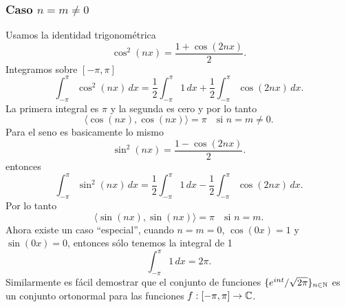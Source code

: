 \documentclass[main.tex]{subfiles}
\begin{document}
\subsubsection{Caso \(n = m \neq 0\)}
Usamos la identidad trigonométrica
\[
\cos^2(nx) = \frac{1 + \cos(2nx)}{2}.
\]
Integramos sobre \([-\pi, \pi]\)
\[
\int_{-\pi}^{\pi} \cos^2(nx) \, dx = \frac{1}{2} \int_{-\pi}^{\pi} 1 \, dx + \frac{1}{2} \int_{-\pi}^{\pi} \cos(2nx) \, dx.
\]
La primera integral es \(\pi\) y la segunda es cero y por lo tanto
\[
\langle \cos(nx), \cos(nx) \rangle = \pi \quad \text{si } n = m \neq 0.
\]
Para el seno es basicamente lo mismo
\[
\sin^2(nx) = \frac{1 - \cos(2nx)}{2}.
\]
entonces
\[
\int_{-\pi}^{\pi} \sin^2(nx) \, dx = \frac{1}{2} \int_{-\pi}^{\pi} 1 \, dx - \frac{1}{2} \int_{-\pi}^{\pi} \cos(2nx) \, dx.
\]
Por lo tanto
\[
\langle \sin(nx), \sin(nx) \rangle = \pi \quad \text{si } n = m.
\]
Ahora existe un caso ``especial'', cuando \(n = m = 0\), \(\cos(0x) = 1\) y \(\sin(0x)=0\), entonces sólo tenemos la integral de 1
\[
\int_{-\pi}^{\pi} 1 \, dx = 2\pi.
\]
\obs Similarmente es f\'acil demostrar que el conjunto de funciones \(\{e^{int}/\sqrt{2\pi}\}_{n\in \mathbb N }\) es un conjunto ortonormal para las funciones \(f:[-\pi,\pi]\to\mathbb C \).
\end{document}
